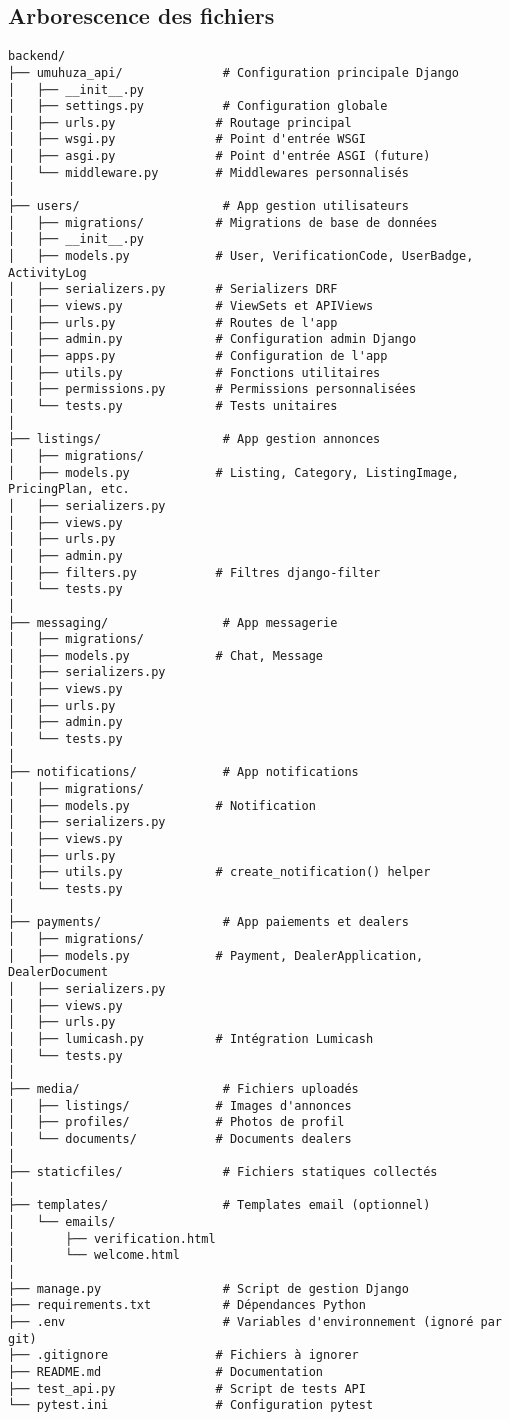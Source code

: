 \subsection{Arborescence des fichiers}

\begin{lstlisting}[caption=Structure du projet backend]
backend/
├── umuhuza_api/              # Configuration principale Django
│   ├── __init__.py
│   ├── settings.py           # Configuration globale
│   ├── urls.py              # Routage principal
│   ├── wsgi.py              # Point d'entrée WSGI
│   ├── asgi.py              # Point d'entrée ASGI (future)
│   └── middleware.py        # Middlewares personnalisés
│
├── users/                    # App gestion utilisateurs
│   ├── migrations/          # Migrations de base de données
│   ├── __init__.py
│   ├── models.py            # User, VerificationCode, UserBadge, ActivityLog
│   ├── serializers.py       # Serializers DRF
│   ├── views.py             # ViewSets et APIViews
│   ├── urls.py              # Routes de l'app
│   ├── admin.py             # Configuration admin Django
│   ├── apps.py              # Configuration de l'app
│   ├── utils.py             # Fonctions utilitaires
│   ├── permissions.py       # Permissions personnalisées
│   └── tests.py             # Tests unitaires
│
├── listings/                 # App gestion annonces
│   ├── migrations/
│   ├── models.py            # Listing, Category, ListingImage, PricingPlan, etc.
│   ├── serializers.py
│   ├── views.py
│   ├── urls.py
│   ├── admin.py
│   ├── filters.py           # Filtres django-filter
│   └── tests.py
│
├── messaging/                # App messagerie
│   ├── migrations/
│   ├── models.py            # Chat, Message
│   ├── serializers.py
│   ├── views.py
│   ├── urls.py
│   ├── admin.py
│   └── tests.py
│
├── notifications/            # App notifications
│   ├── migrations/
│   ├── models.py            # Notification
│   ├── serializers.py
│   ├── views.py
│   ├── urls.py
│   ├── utils.py             # create_notification() helper
│   └── tests.py
│
├── payments/                 # App paiements et dealers
│   ├── migrations/
│   ├── models.py            # Payment, DealerApplication, DealerDocument
│   ├── serializers.py
│   ├── views.py
│   ├── urls.py
│   ├── lumicash.py          # Intégration Lumicash
│   └── tests.py
│
├── media/                    # Fichiers uploadés
│   ├── listings/            # Images d'annonces
│   ├── profiles/            # Photos de profil
│   └── documents/           # Documents dealers
│
├── staticfiles/              # Fichiers statiques collectés
│
├── templates/                # Templates email (optionnel)
│   └── emails/
│       ├── verification.html
│       └── welcome.html
│
├── manage.py                 # Script de gestion Django
├── requirements.txt          # Dépendances Python
├── .env                      # Variables d'environnement (ignoré par git)
├── .gitignore               # Fichiers à ignorer
├── README.md                # Documentation
├── test_api.py              # Script de tests API
└── pytest.ini               # Configuration pytest
\end{lstlisting}

